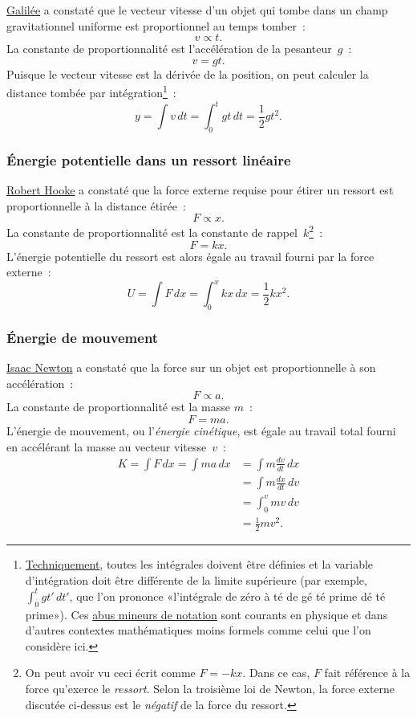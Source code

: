 \href{https://fr.wikipedia.org/wiki/Galil%C3%A9e_(savant)}{Galilée} a constaté
que le vecteur vitesse d'un objet qui tombe dans un champ gravitationnel
uniforme est proportionnel au temps tomber~:
\[ v \propto t. \]
La constante de proportionnalité est l'accélération de la pesanteur~$g$~:
\[ v = g t. \]
Puisque le vecteur vitesse est la dérivée de la position, on peut calculer la
distance tombée par
intégration\ns\footnote{\href{https://bit.ly/32mB2CF}{Techniquement}, toutes les
intégrales doivent être définies et la variable d'intégration doit être
différente de la limite supérieure (par exemple, $\int_{0}^{t} gt'\, dt'$, que
l'on prononce «\ns l'intégrale de zéro à té de gé té prime dé té prime\ns »). Ces
\href{https://fr.wikipedia.org/wiki/Abus_de_notation}{abus mineurs de notation}
sont courants en physique et dans d'autres contextes mathématiques moins formels
comme celui que l'on considère ici.}~:
\[ y = \int v\,dt = \int_0^t gt\,dt = \textstyle{\frac{1}{2}} gt^2. \]


    \subsubsection{Énergie potentielle dans un ressort linéaire} %
    \label{sec:potential_energy_in_a_linear_spring}

\href{https://fr.wikipedia.org/wiki/Robert_Hooke}{Robert Hooke} a constaté que
la force externe requise pour étirer un ressort est proportionnelle à la
distance étirée~:
\[ F \propto x. \]
La constante de proportionnalité est la constante de rappel~$k$\ns\footnote{On
peut avoir vu ceci écrit comme $F=-kx$. Dans ce cas, $F$ fait référence à la
force qu'exerce le \emph{ressort}. Selon la troisième loi de Newton, la force
externe discutée ci-dessus est le \emph{négatif} de la force du ressort.}~:
\[ F = k x. \]
L'énergie potentielle du ressort est alors égale au travail fourni par la force
externe~:
\[ U = \int F\,dx = \int_0^x kx\,dx = \textstyle{\frac{1}{2}} kx^2. \]

    \subsubsection{Énergie de mouvement} %
    \label{sec:energy_of_motion}

\href{https://fr.wikipedia.org/wiki/Isaac_Newton}{Isaac Newton} a constaté que
la force sur un objet est proportionnelle à son accélération~:
\[ F \propto a. \]
La constante de proportionnalité est la masse $m$~:
\[ F = m a. \]
L'énergie de mouvement, ou l'\emph{énergie cinétique}, est égale au travail
total fourni en accélérant la masse au vecteur vitesse~$v$~:
\[
\begin{split}
K = \int F\,dx = \int ma\,dx & = \int m\frac{dv}{dt}\,dx \\ & = \int m\frac{dx}{dt}\,dv \\ & = \int_0^v mv\,dv \\ & = \textstyle{\frac{1}{2}} mv^2.
\end{split}
\]

